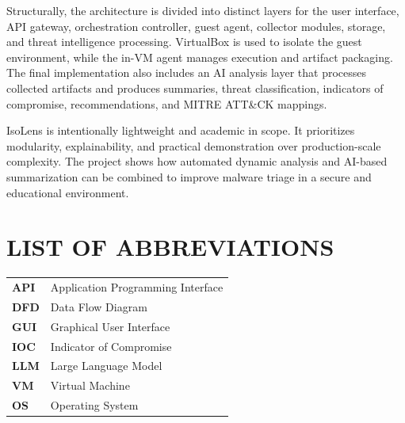 \documentclass[a4paper,12pt,oneside]{report}
\begin{document}
\par

\par

Structurally, the architecture is divided into distinct layers for the user interface, API gateway, orchestration controller, guest agent, collector modules, storage, and threat intelligence processing. VirtualBox is used to isolate the guest environment, while the in-VM agent manages execution and artifact packaging. The final implementation also includes an AI analysis layer that processes collected artifacts and produces summaries, threat classification, indicators of compromise, recommendations, and MITRE ATT\&CK mappings.

\par

\par

IsoLens is intentionally lightweight and academic in scope. It prioritizes modularity, explainability, and practical demonstration over production-scale complexity. The project shows how automated dynamic analysis and AI-based summarization can be combined to improve malware triage in a secure and educational environment.

\newpage
\tableofcontents

\newpage
\listoffigures
{}

\newpage
\listoftables
{}

\newpage
\chapter*{\uppercase{List of Abbreviations}}
\begin{table}[H]
\renewcommand{\arraystretch}{1.5}
\begin{tabularx}{\textwidth}{>{\bfseries}l X}
API & Application Programming Interface \\
DFD & Data Flow Diagram \\
GUI & Graphical User Interface \\
IOC & Indicator of Compromise \\
LLM & Large Language Model \\
VM & Virtual Machine \\
OS & Operating System \\
\end{tabularx}
\end{table}
\end{document}
